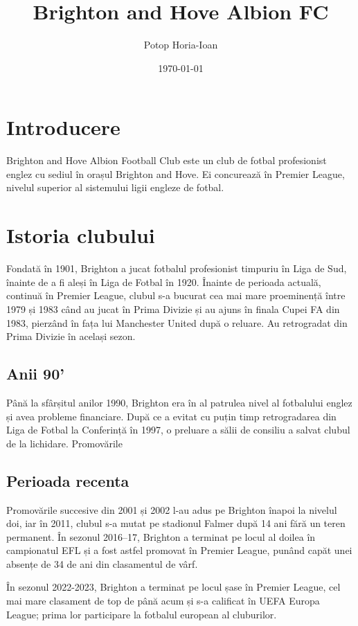 \documentclass{article}
\title{Brighton and Hove Albion FC}
\author{Potop Horia-Ioan}
\date{\today}
\begin{document}
\maketitle

\tableofcontents
\newpage
\section{Introducere}
\hspace{0.5cm}Brighton and Hove Albion Football Club este un club de fotbal profesionist englez cu sediul în orașul Brighton and Hove. Ei concurează în Premier League, nivelul superior al sistemului ligii engleze de fotbal. 

\section{Istoria clubului}
\hspace{0.5cm}Fondată în 1901, Brighton a jucat fotbalul profesionist timpuriu în Liga de Sud, înainte de a fi aleși în Liga de Fotbal în 1920.  Înainte de perioada actuală, continuă în Premier League, clubul s-a bucurat cea mai mare proeminență între 1979 și 1983 când au jucat în Prima Divizie și au ajuns în finala Cupei FA din 1983, pierzând în fața lui Manchester United după o reluare. Au retrogradat din Prima Divizie în același sezon.

\subsection{Anii 90'}
\hspace{0.5cm}Până la sfârșitul anilor 1990, Brighton era în al patrulea nivel al fotbalului englez și avea probleme financiare. După ce a evitat cu puțin timp retrogradarea din Liga de Fotbal la Conferință în 1997, o preluare a sălii de consiliu a salvat clubul de la lichidare. Promovările 

\subsection{Perioada recenta}
\hspace{0.5cm}Promovările succesive din 2001 și 2002 l-au adus pe Brighton înapoi la nivelul doi, iar în 2011, clubul s-a mutat pe stadionul Falmer după 14 ani fără un teren permanent. În sezonul 2016–17, Brighton a terminat pe locul al doilea în campionatul EFL și a fost astfel promovat în Premier League, punând capăt unei absențe de 34 de ani din clasamentul de vârf. \par În sezonul 2022-2023, Brighton a terminat pe locul șase în Premier League, cel mai mare clasament de top de până acum și s-a calificat în UEFA Europa League; prima lor participare la fotbalul european al cluburilor.
\end{document}

